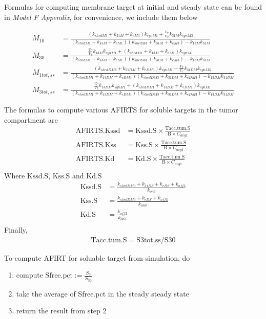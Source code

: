 Formulas for computing membrane target at initial and steady state can be found in 
\emph{Model F Appendix}, for convenience, we include them below

\newcommand{\Det}{(k_{shedM1} + k_{13M} + k_{eM1})(k_{shedM3} + k_{31M} + k_{eM3}) - k_{13M}k_{31M}}

\newcommand{\DetSS}{(k_{shedDM1} + k_{13DM} + k_{eDM1})(k_{shedDM3} + k_{31DM} + k_{eDM3})
- k_{13DM}k_{31DM}}
\begin{align*}
    M_{10} & = \frac{(k_{shedM3} + k_{31M} + k_{eM3})k_{synM1} + \frac{V_T}{V_C}k_{31M}k_{synM3}}
                    {\Det} \\
    M_{30} & = \frac{\frac{V_C}{V_T}k_{13M}k_{synM1} + (k_{shedM1} + k_{13M} + k_{eM1})k_{synM1}}
                    {\Det} \\
    M_{1tot,ss} & = \frac{(k_{shedDM3} + k_{31DM} + k_{eDM3})k_{synM1} + 
                            \frac{V_T}{V_C}k_{31DM}k_{synM3}}
                    {\DetSS} \\
    M_{3tot,ss} & = \frac{\frac{V_C}{V_T}k_{13DM}k_{synM1} + 
                            (k_{shedDM1} + k_{13DM} + k_{eDM1})k_{synM1}}
                    {\DetSS}
\end{align*}


The formulas to compute various AFIRTS for soluble targets in the tumor compartment are 
\begin{align}
    \text{AFIRTS.Kssd} & = \text{Kssd.S}\times \frac{\text{Tacc.tum.S}}{\text{B}\times C_{avg1}} \\
    \text{AFIRTS.Kss}  & = \text{Kss.S}\times \frac{\text{Tacc.tum.S}}{\text{B}\times C_{avg1}} \\
    \text{AFIRTS.Kd}   & = \text{Kd.S}\times \frac{\text{Tacc.tum.S}}{\text{B}\times C_{avg1}} \\
\end{align}
Where $\text{Kssd.S}$, $\text{Kss.S}$ and $\text{Kd.S}$
\begin{align}
    \text{Kssd.S} & = \frac{k_{shedDM3} + k_{31DS} + k_{eDS} + k_{off3}}{k_{on3}} \\
    \text{Kss.S}  & = \frac{k_{shedDM3} + k_{eDS} + k_{off3}}{k_{on3}} \\
    \text{Kd.S}   & = \frac{k_{off3}}{k_{on3}} \\
\end{align}
 Finally,
\begin{align}
    \text{Tacc.tum.S} = \text{S3tot.ss} / \text{S30}
\end{align}


To compute AFIRT for soluable target from simulation, do
\begin{enumerate}
\item compute $\text{Sfree.pct}:=\frac{S_3}{S_{30}}$
\item take the average of Sfree.pct in the steady steady state
\item return the result from step 2
\end{enumerate}